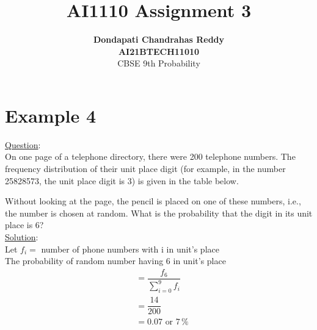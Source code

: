 \documentclass[journal,12pt,twocolumn]{IEEEtran}
\begin{document}
\title{\textbf{AI1110 Assignment 3} }
\author{\textbf{Dondapati Chandrahas Reddy}\\\textbf{AI21BTECH11010}\\ CBSE 9th Probability}
\maketitle

{\section{Example 4}}

{\large \underline{Question}:}\\

On one page of a telephone directory, there were 200 telephone numbers.
The frequency distribution of their unit place digit (for example, in the number 25828573,
the unit place digit is 3) is given in the table below.

\begin{table}[h!]
	
\end{table}


Without looking at the page, the pencil is placed on one of these numbers, i.e., the
number is chosen at random. What is the probability that the digit in its unit place is 6? \\

{\large \underline{Solution}:}\\

Let $f_i = $ number of phone numbers with i in unit's place \\

The probability of random number having 6 in unit's place
\begin{align}
	& = \dfrac{f_6}{\sum\limits_{i=0}^{9} f_i}  \\
	& = \dfrac{14}{200} \\
	& = 0.07 \text{ or } 7\,\% 	
\end{align} 
\end{document}

